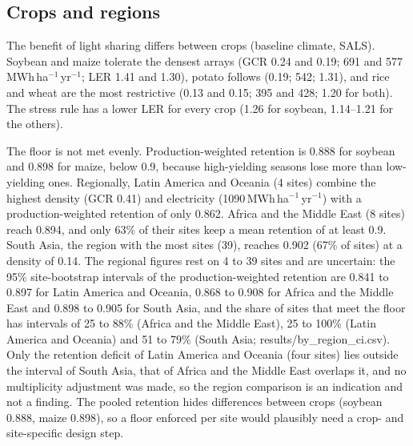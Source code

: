 \subsection{Crops and regions}\label{sec:crops}
The benefit of light sharing differs between crops (baseline climate, SALS). Soybean and maize tolerate the densest arrays (GCR 0.24 and 0.19; 691 and 577\,MWh\,ha$^{-1}$\,yr$^{-1}$; LER 1.41 and 1.30), potato follows (0.19; 542; 1.31), and rice and wheat are the most restrictive (0.13 and 0.15; 395 and 428; 1.20 for both). The stress rule has a lower LER for every crop (1.26 for soybean, 1.14--1.21 for the others).

The floor is not met evenly. Production-weighted retention is 0.888 for soybean and 0.898 for maize, below 0.9, because high-yielding seasons lose more than low-yielding ones. Regionally, Latin America and Oceania (4 sites) combine the highest density (GCR 0.41) and electricity (1090\,MWh\,ha$^{-1}$\,yr$^{-1}$) with a production-weighted retention of only 0.862. Africa and the Middle East (8 sites) reach 0.894, and only 63\% of their sites keep a mean retention of at least 0.9. South Asia, the region with the most sites (39), reaches 0.902 (67\% of sites) at a density of 0.14. The regional figures rest on 4 to 39 sites and are uncertain: the 95\% site-bootstrap intervals of the production-weighted retention are 0.841 to 0.897 for Latin America and Oceania, 0.868 to 0.908 for Africa and the Middle East and 0.898 to 0.905 for South Asia, and the share of sites that meet the floor has intervals of 25 to 88\% (Africa and the Middle East), 25 to 100\% (Latin America and Oceania) and 51 to 79\% (South Asia; results/by\_region\_ci.csv). Only the retention deficit of Latin America and Oceania (four sites) lies outside the interval of South Asia, that of Africa and the Middle East overlaps it, and no multiplicity adjustment was made, so the region comparison is an indication and not a finding. The pooled retention hides differences between crops (soybean 0.888, maize 0.898), so a floor enforced per site would plausibly need a crop- and site-specific design step.

